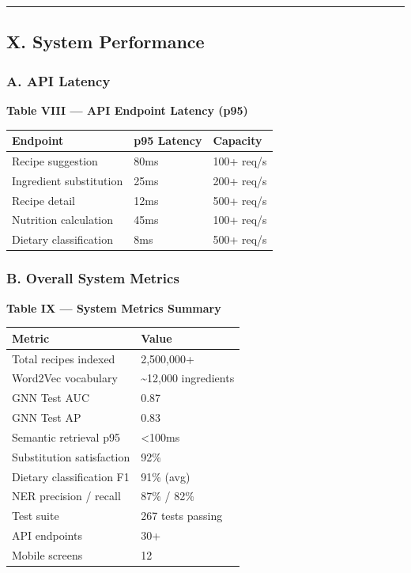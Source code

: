 \documentclass[10pt,conference,compsoc]{IEEEtran}
\begin{document}
\begin{center}\rule{0.5\linewidth}{0.5pt}\end{center}

\subsection{X. System Performance}\label{x.-system-performance}

\subsubsection{A. API Latency}\label{a.-api-latency}

\textbf{Table VIII --- API Endpoint Latency (p95)}

\begin{longtable}[]{@{}lll@{}}
\toprule\noalign{}
Endpoint & p95 Latency & Capacity \\
\midrule\noalign{}
\endhead
\bottomrule\noalign{}
\endlastfoot
Recipe suggestion & 80ms & 100+ req/s \\
Ingredient substitution & 25ms & 200+ req/s \\
Recipe detail & 12ms & 500+ req/s \\
Nutrition calculation & 45ms & 100+ req/s \\
Dietary classification & 8ms & 500+ req/s \\
\end{longtable}

\subsubsection{B. Overall System
Metrics}\label{b.-overall-system-metrics}

\textbf{Table IX --- System Metrics Summary}

\begin{longtable}[]{@{}ll@{}}
\toprule\noalign{}
Metric & Value \\
\midrule\noalign{}
\endhead
\bottomrule\noalign{}
\endlastfoot
Total recipes indexed & 2,500,000+ \\
Word2Vec vocabulary & \textasciitilde12,000 ingredients \\
GNN Test AUC & 0.87 \\
GNN Test AP & 0.83 \\
Semantic retrieval p95 & \textless100ms \\
Substitution satisfaction & 92\% \\
Dietary classification F1 & 91\% (avg) \\
NER precision / recall & 87\% / 82\% \\
Test suite & 267 tests passing \\
API endpoints & 30+ \\
Mobile screens & 12 \\
\end{longtable}
\end{document}
